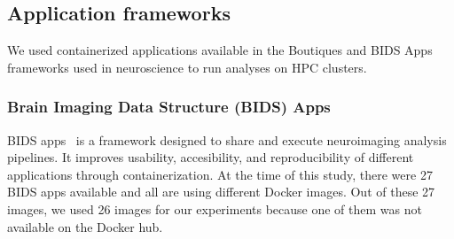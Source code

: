\documentclass[a4paper,num-refs]{oup-contemporary}
\begin{document}
%
%
\subsection{Application frameworks}

We used containerized applications available in the Boutiques and BIDS Apps
frameworks used in neuroscience to run analyses on HPC clusters. 

\subsubsection{Brain Imaging Data Structure (BIDS) Apps}

BIDS apps~\cite{gorgolewski2017bids} is a framework designed to share and execute neuroimaging
analysis pipelines. It improves usability, accesibility, and reproducibility
of different applications through containerization.
At the time of this study, there were 27 BIDS apps available and all are using different Docker images.
Out of these 27 images, we used 26 images for our experiments because one of them was not available
on the Docker hub.
\end{document}

